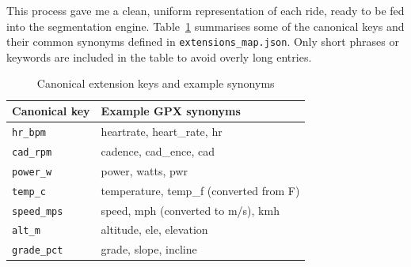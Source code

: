 \documentclass[11pt,a4paper]{report}
\begin{document}
This process gave me a clean, uniform representation of each ride, ready to be fed into the segmentation engine. Table~\ref{tab:extensionsmap} summarises some of the canonical keys and their common synonyms defined in \texttt{extensions\_map.json}. Only short phrases or keywords are included in the table to avoid overly long entries.
\begin{table}[H]
	\centering
	\caption{Canonical extension keys and example synonyms}
	\label{tab:extensionsmap}
	\begin{tabular}{ll}
		\toprule
		Canonical key       & Example GPX synonyms                                 \\
		\midrule
		\texttt{hr\_bpm}    & heartrate, heart\_rate, hr                           \\
		\texttt{cad\_rpm}   & cadence, cad\_ence, cad                              \\
		\texttt{power\_w}   & power, watts, pwr                                    \\
		\texttt{temp\_c}    & temperature, temp\_f (converted from \textdegree{}F) \\
		\texttt{speed\_mps} & speed, mph (converted to m/s), kmh                   \\
		\texttt{alt\_m}     & altitude, ele, elevation                             \\
		\texttt{grade\_pct} & grade, slope, incline                                \\
		\bottomrule
	\end{tabular}
\end{table}
\end{document}
